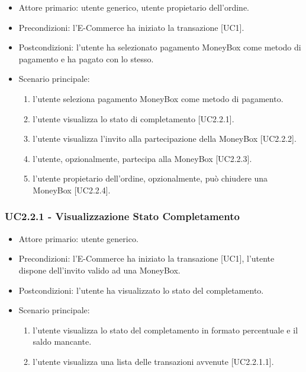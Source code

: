     \begin{itemize}
    \item Attore primario: utente generico, utente propietario dell'ordine.
    \item Precondizioni: l'E-Commerce ha iniziato la transazione [UC1].
    \item Postcondizioni: l'utente ha selezionato pagamento MoneyBox come metodo di pagamento e ha pagato con lo stesso.
    \item Scenario principale:\begin{enumerate}
        \item l'utente seleziona pagamento MoneyBox come metodo di pagamento.
        \item l'utente visualizza lo stato di completamento [UC2.2.1].
        \item l'utente visualizza l'invito alla partecipazione della MoneyBox [UC2.2.2].
        \item l'utente, opzionalmente, partecipa alla MoneyBox [UC2.2.3].
        \item l'utente propietario dell'ordine, opzionalmente, può chiudere una MoneyBox [UC2.2.4].
        \end{enumerate}
    \end{itemize}

    \subsubsection{UC2.2.1 - Visualizzazione Stato Completamento}

    \begin{itemize}
    \item Attore primario: utente generico.
    \item Precondizioni: l'E-Commerce ha iniziato la transazione [UC1], l'utente dispone dell'invito valido ad una MoneyBox.
    \item Postcondizioni: l'utente ha visualizzato lo stato del completamento.
    \item Scenario principale: \begin{enumerate}
        \item l'utente visualizza lo stato del completamento in formato percentuale e il saldo mancante.
        \item l'utente visualizza una lista delle transazioni avvenute [UC2.2.1.1].
        \end{enumerate}
    \end{itemize}

